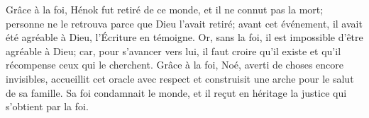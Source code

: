 Grâce à la foi, Hénok fut retiré de ce monde, et il ne connut pas la mort;
	personne ne le retrouva parce que Dieu l’avait retiré;
	avant cet événement, il avait été agréable à Dieu, l’Écriture en témoigne.
Or, sans la foi, il est impossible d’être agréable à Dieu;
	car, pour s’avancer vers lui, il faut croire qu’il existe
	et qu’il récompense ceux qui le cherchent.
Grâce à la foi, Noé, averti de choses encore invisibles,
	accueillit cet oracle avec respect
		et construisit une arche pour le salut de sa famille.
Sa foi condamnait le monde,
	et il reçut en héritage la justice qui s’obtient par la foi.
